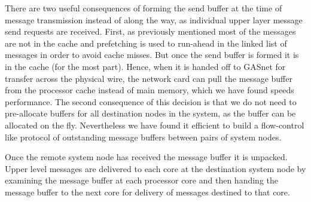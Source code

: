 There are two useful consequences of forming the send buffer at the time of
message transmission instead of along the way, as individual upper layer
message send requests are received. First, as previously mentioned most of the
messages are not in the cache and prefetching is used to run-ahead in the
linked list of messages in order to avoid cache misses. But once the send
buffer is formed it is in the cache (for the most part). Hence, when it is
handed off to GASnet for transfer across the physical wire, the network card
can pull the message buffer from the processor cache instead of main memory,
which we have found speeds performance. The second consequence of this
decision is that we do not need to pre-allocate buffers for all destination
nodes in the system, as the buffer can be allocated on the fly. Nevertheless
we have found it efficient to build a flow-control like protocol of
outstanding message buffers between pairs of system nodes.

Once the remote system node has received the message buffer it is unpacked.
Upper level \Grappa messages are delivered to each core at the destination
system node by examining the message buffer at each processor core and then
handing the message buffer to the next core for delivery of messages destined
to that core.





